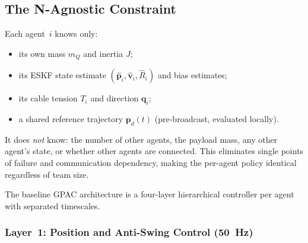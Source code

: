 \subsection{The N-Agnostic Constraint}
\label{sec:n_agnostic}

Each agent~$i$ knows only:
\begin{itemize}[nosep]
  \item its own mass $m_Q$ and inertia $J$;
  \item its ESKF state estimate $(\hat{\bm{p}}_i, \hat{\bm{v}}_i, \hat{R}_i)$ and bias estimates;
  \item its cable tension $T_i$ and direction $\bm{q}_i$;
  \item a shared reference trajectory $\bm{p}_d(t)$ (pre-broadcast, evaluated locally).
\end{itemize}
It does \emph{not} know: the number of other agents, the payload mass, any other agent's state, or whether other agents are connected. This eliminates single points of failure and communication dependency, making the per-agent policy identical regardless of team size.

The baseline GPAC architecture is a four-layer hierarchical controller per agent with separated timescales.

\subsubsection{Layer~1: Position and Anti-Swing Control (50~Hz)}

